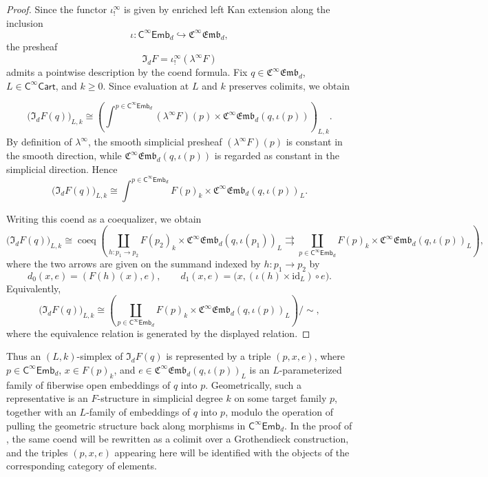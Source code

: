 \documentclass{amsart}
\newcommand{\cat}[1]{\mathsf{#1}}
\newcommand{\id}{\mathrm{id}}
\newcommand{\Cart}{\cat{C}^{\infty}\cat{Cart}}
\newcommand{\fembnoniso}[1]{\cat{C}^{\infty}\cat{Emb}_{#1}}
\newcommand{\femb}[1]{\mathfrak{C}^{\infty}\mathfrak{Emb}_{#1}}
\theoremstyle{definition}
\numberwithin{equation}{subsection}
\numberwithin{subsubsection}{subsection}
\begin{document}
\begin{proof}
  Since the functor \( \iota_!^\infty \) is given by enriched left Kan
  extension along the inclusion
  \[
    \iota:\fembnoniso{d}\hookrightarrow \femb{d},
  \]
  the presheaf
  \[
    \mathfrak{I}_{d}F=\iota_!^\infty(\lambda^\infty F)
  \]
  admits a pointwise description by the coend formula. Fix
  \(q\in \femb{d}\), \(L\in \Cart\), and \(k\geq 0\). Since evaluation at
  \(L\) and \(k\) preserves colimits, we obtain

  \begin{equation}\label{eq:pointwise.formula.for.isotopification}
    \bigl(\mathfrak{I}_{d}F(q)\bigr)_{L,k}
    \cong
    \left(
      \int^{p\in \fembnoniso{d}}
      (\lambda^\infty F)(p)\times \femb{d}(q,\iota(p))
    \right)_{L,k}.
  \end{equation}
  By definition of \( \lambda^\infty \), the smooth simplicial presheaf
  \( (\lambda^\infty F)(p) \) is constant in the smooth direction, while
  \( \femb{d}(q,\iota(p)) \) is regarded as constant in the simplicial
  direction. Hence
  \[
    \bigl(\mathfrak{I}_{d}F(q)\bigr)_{L,k}
    \cong
    \int^{p\in \fembnoniso{d}}
    F(p)_k\times \femb{d}(q,\iota(p))_L.
  \]

  Writing this coend as a coequalizer, we obtain
  \[
    \bigl(\mathfrak{I}_{d}F(q)\bigr)_{L,k}
    \cong
    \operatorname{coeq}\left(
      \coprod_{h:p_1\to p_2}
      F(p_2)_k\times \femb{d}(q,\iota(p_1))_L
      \rightrightarrows
      \coprod_{p\in \fembnoniso{d}}
      F(p)_k\times \femb{d}(q,\iota(p))_L
    \right),
  \]
  where the two arrows are given on the summand indexed by
  \(h:p_1\to p_2\) by
  \[
    d_0(x,e)=(F(h)(x),e),
    \qquad
    d_1(x,e)=\bigl(x,(\iota(h)\times \id_L)\circ e\bigr).
  \]
  Equivalently,
  \[
    \bigl(\mathfrak{I}_{d}F(q)\bigr)_{L,k}
    \cong
    \left(
      \coprod_{p\in \fembnoniso{d}}
      F(p)_k\times \femb{d}(q,\iota(p))_L
    \right)\Big/{\sim},
  \]
  where the equivalence relation is generated by the displayed relation.
\end{proof}

Thus an \((L,k)\)-simplex of \(\mathfrak{I}_{d}F(q)\) is represented by a
triple \((p,x,e)\), where \(p\in \fembnoniso{d}\),
\(x\in F(p)_k\), and
\(e\in \femb{d}(q,\iota(p))_L\) is an \(L\)-parameterized family of
fiberwise open embeddings of \(q\) into \(p\). Geometrically, such a
representative is an \(F\)-structure in simplicial degree \(k\) on some
target family \(p\), together with an \(L\)-family of embeddings of \(q\)
into \(p\), modulo the operation of pulling the geometric structure back
along morphisms in \(\fembnoniso{d}\). In the proof of
, the same coend will be rewritten as a colimit
over a Grothendieck construction, and the triples \((p,x,e)\) appearing here
will be identified with the objects of the corresponding category of
elements.
\end{document}
